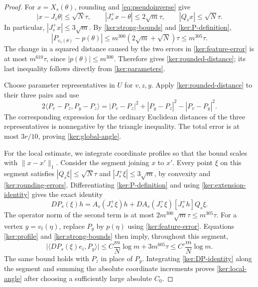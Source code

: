 \begin{proof}
For $x=X_s(\theta)$, rounding and \eqref{eq:pseudoinverse} give
\begin{equation}
\label{ker:rounding-errors}
 |x-J_s\theta|\le\sqrt N\tau,\qquad
 |J_s^+x-\theta|\le2\sqrt m\tau,\qquad
 |Q_sx|\le\sqrt N\tau.
\end{equation}
In particular, $|J_s^+x|\le3\sqrt m$.  By
\eqref{ker:strong-bounds} and \eqref{ker:P-definition},
\begin{equation}
\label{ker:feature-error}
 |P_{v_s(\theta)}-p(\theta)|
 \le m^{300}(2\sqrt m+\sqrt N)\tau
 \le m^{305}\tau.
\end{equation}
The change in a squared distance caused by the two errors in
\eqref{ker:feature-error} is at most $m^{610}\tau$, since
$|p(\theta)|\le m^{300}$.  Therefore  gives
\eqref{ker:rounded-distance}; its last inequality follows directly from
\eqref{ker:parameters}.

Choose parameter representatives in $U$ for $v,z,y$.  Apply
\eqref{ker:rounded-distance} to their three pairs and use
\[
 2\langle P_v-P_z,P_y-P_z\rangle
 =|P_v-P_z|^2+|P_y-P_z|^2-|P_v-P_y|^2.
\]
The corresponding expression for the ordinary Euclidean distances of
the three representatives is nonnegative by the triangle inequality.
The total error is at most $3r/10$, proving
\eqref{ker:global-angle}.

For the local estimate, we integrate coordinate profiles so that the bound
scales with $\|x-x'\|_1$. Consider the segment joining $x$ to $x'$.
Every point $\xi$ on this segment satisfies
$|Q_s\xi|\le\sqrt N\tau$ and $|J_s^+\xi|\le3\sqrt m$, by convexity
and \eqref{ker:rounding-errors}.  Differentiating
\eqref{ker:P-definition} and using
\eqref{ker:extension-identity} gives the exact identity
\begin{equation}
\label{ker:DP-identity}
 DP_s(\xi)h
 =A_s(J_s^+\xi)h
  +DA_s(J_s^+\xi)[J_s^+h]Q_s\xi.
\end{equation}
The operator norm of the second term is at most
$2m^{300}\sqrt m\tau\le m^{305}\tau$.
For a vertex $y=v_t(\eta)$, replace $P_y$ by $p(\eta)$ using
\eqref{ker:feature-error}.  Equations \eqref{ker:profile} and
\eqref{ker:strong-bounds} then imply, throughout this segment,
\[
 \bigl|\langle DP_s(\xi)e_i,P_y\rangle\bigr|
 \le C\frac{m}{N}\log m+3m^{605}\tau
 \le C'\frac{m}{N}\log m.
\]
The same bound holds with $P_z$ in place of $P_y$.
Integrating \eqref{ker:DP-identity} along the segment and summing the
absolute coordinate increments proves \eqref{ker:local-angle} after
choosing a sufficiently large absolute $C_0$.
\end{proof}
